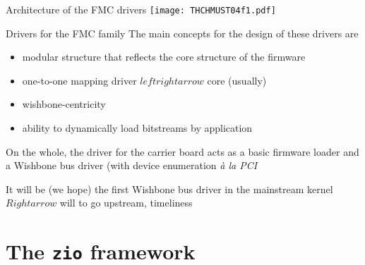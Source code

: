 \documentclass{beamer}
\begin{document}
\begin{frame}{Architecture of the FMC drivers}
\texttt{[image: THCHMUST04f1.pdf]}
\end{frame}

\begin{frame}{Drivers for the FMC family}
The main concepts for the design of these drivers are
\begin{itemize}
\item modular structure that reflects the core structure of the firmware
\item one-to-one mapping driver $leftrightarrow$ core (usually)
\item wishbone-centricity
\item ability to dynamically load bitstreams by application
\end{itemize}
On the whole, the driver for the carrier board acts as a basic firmware
loader and a Wishbone bus driver (with device enumeration
\emph{\`a la PCI}

It will be (we hope) the first Wishbone bus driver in the mainstream
kernel $Rightarrow$ will to go upstream, timeliness
\end{frame}

\section{The \texttt{zio} framework}
\end{document}
